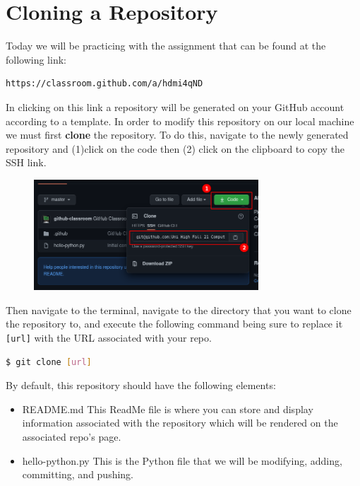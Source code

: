 \documentclass[a4paper,10pt]{article} %
\begin{document}
\section{Cloning a Repository}

Today we will be practicing with the assignment that can be found at the following link: \\
\begin{lstlisting}
https://classroom.github.com/a/hdmi4qND
\end{lstlisting}
In clicking on this link a repository will be generated on your GitHub account according to a template. In order to modify this repository on our local machine we must first \textbf{clone} the repository. To do this, navigate to the newly generated repository and  (1)click on the code then (2) click on the clipboard to copy the SSH link.
\begin{figure}[H]
  \centering
  \includegraphics[width=0.75\textwidth]{./imgs/cloning.png}
\end{figure}
Then navigate to the terminal, navigate to the directory that you want to clone the repository to, and execute the following command being sure to replace it \lstinline|[url]| with the URL associated with your repo.

\begin{lstlisting}[language=bash]
$ git clone [url]
\end{lstlisting}

By default, this repository should have the following elements:
\begin{itemize}
  \item README.md \textrightarrow This ReadMe file is where you can store and display information associated with the repository which will be rendered on the associated repo's page.
  \item hello-python.py \textrightarrow This is the Python file that we will be modifying, adding, committing, and pushing.
\end{itemize}
\end{document}
